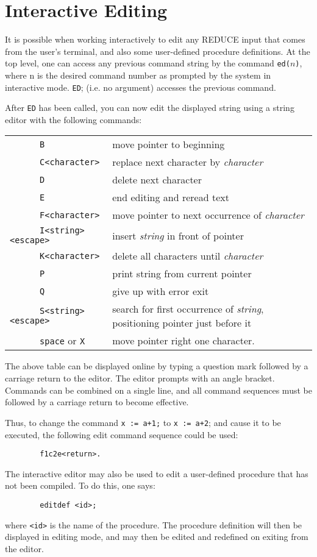 \documentclass[11pt,letterpaper]{book}
\makeatletter
\newlength{\rboxwidth}
\newcommand{\REDUCE}{REDUCE}
\newcommand{\underscore}{\_}
\newcommand{\ttindex}[1]{{\renewcommand{\_}{\protect\underscore}%
                          \index{#1@{\tt #1}}}}
\makeatother
\begin{document}
\section{Interactive Editing}
It is possible when working interactively to edit any {\REDUCE} input that
comes from the user's terminal, and also some user-defined procedure
definitions.  At the top level, one can access any previous command string
by the command {\tt ed(}$n${\tt )},\ttindex{ED} where n is the desired
command number as prompted by the system in interactive mode. {\tt ED};
(i.e. no argument) accesses the previous command.

After {\tt ED} has been called, you can now edit the displayed string using a
string editor with the following commands:

\begin{tabular}{lp{\rboxwidth}}
{\tt~~~~~  B} & move pointer to beginning \\
{\tt~~~~~  C<character>} & replace next character by
{\em character} \\
{\tt~~~~~  D} & delete next character \\
{\tt~~~~~  E} & end editing and reread text \\
{\tt~~~~~  F<character>} & move pointer to next
occurrence of {\em character} \\[1.7pt]
{\tt~~~~~  I<string><escape>} &
 insert {\em string\/} in front of pointer \\
{\tt~~~~~  K<character>} & delete all characters
 until {\em character} \\
{\tt~~~~~  P} & print string from current pointer \\
{\tt~~~~~  Q} & give up with error exit \\
{\tt~~~~~  S<string><escape>} &
 search for first occurrence of {\em string},
                             positioning pointer just before it \\
{\tt~~~~~  space} or {\tt X} & move pointer right
one character.
\end{tabular}

The above table can be displayed online by typing a question mark followed
by a carriage return to the editor. The editor prompts with an angle
bracket. Commands can be combined on a single line, and all command
sequences must be followed by a carriage return to become effective.

Thus, to change the command {\tt x := a+1;} to {\tt x := a+2}; and cause
it to be executed, the following edit command sequence could be used:
{\small\begin{verbatim}
        f1c2e<return>.
\end{verbatim}}
The interactive editor may also be used to edit a user-defined procedure that
has not been compiled.  To do this, one says:
\ttindex{EDITDEF}
{\small\begin{verbatim}
        editdef <id>;
\end{verbatim}}
where {\tt <id>} is the name of the procedure.  The procedure definition
will then be displayed in editing mode, and may then be edited and
redefined on exiting from the editor.
\end{document}
